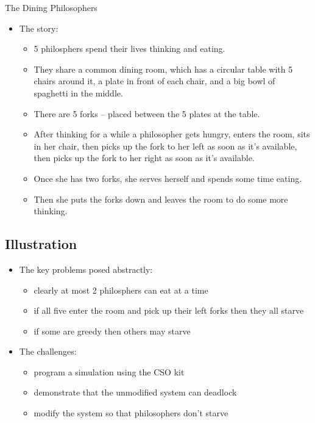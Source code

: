 \documentclass{concdistfoils}
\def\heading#1{\begin{cframed}[8.8in]{#1}\end{cframed}}
\begin{document}
\begin{slide}
\heading{The Dining Philosophers}
\vfill
\begin{itemize}
\item The story:
\begin{itemize}
\item 5 philosphers spend their lives thinking and eating.
\item They share a common dining room, which has a circular table with 5 chairs 
      around it, a plate in front of each chair, and a big bowl of spaghetti in the middle.
\item There are  5 forks -- placed between the 5 plates at the table.
\item After thinking for a while a philosopher gets hungry, enters the room, 
      sits in her chair, then picks up the
      fork to her left as soon as it's available, then picks up the fork 
      to her right as soon as it's available.
\item Once she has two forks, she serves herself and spends some time eating.
\item Then she puts the forks down and leaves the room to do some more thinking.
\end{itemize}
\end{itemize}
\end{slide}

\subsection{Illustration}
\begin{slide}
\begin{center}
\end{center}
\end{slide}

\begin{slide}
\begin{itemize}
\item The key problems posed abstractly: 
\begin{itemize}
\item clearly at most 2 philosphers can eat at a time
\item if all five enter the room and pick up their left forks then they all starve 
\item if some are greedy then others may starve
\end{itemize}
\vfill
\item The challenges:
\begin{itemize}
\item  program a simulation using the CSO kit
\item  demonstrate that the unmodified system can deadlock
\item  modify the system so that philosophers don't starve
\end{itemize}
\end{itemize}
\end{slide}
\end{document}
